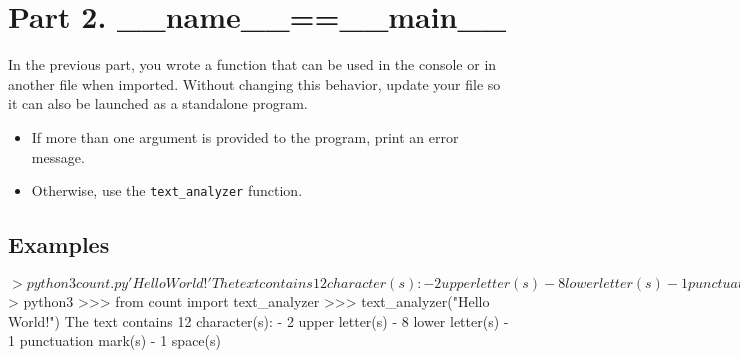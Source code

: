 
\section*{Part 2. \_\_name\_\_==\_\_main\_\_}

In the previous part, you wrote a function that can be used in the console or in another file when imported.
Without changing this behavior, update your file so it can also be launched as a standalone program.

\begin{itemize}
	\item If more than one argument is provided to the program, print an error message. 
	\item Otherwise, use the \texttt{text\_analyzer} function.
\end{itemize}

\subsection*{Examples}
\begin{42console}
$> python3 count.py 'Hello World!'
The text contains 12 character(s):
- 2 upper letter(s)
- 8 lower letter(s)
- 1 punctuation mark(s)
- 1 space(s)
$> python3
>>> from count import text_analyzer
>>> text_analyzer("Hello World!")
The text contains 12 character(s):
- 2 upper letter(s)
- 8 lower letter(s)
- 1 punctuation mark(s)
- 1 space(s)
\end{42console}